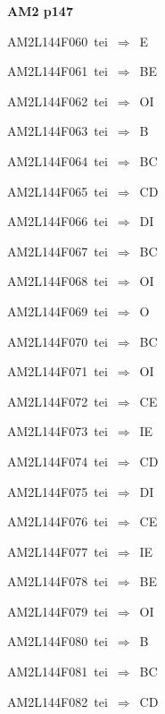 \par\vfill\eject
{\bf\hfill AM2 p147\hfill\hbox{}}\par\bigskip
{\sixrm AM2L144F060\ {\sixit tei}\ }$\Rightarrow$\ E\par\smallskip
{\sixrm AM2L144F061\ {\sixit tei}\ }$\Rightarrow$\ BE\par\smallskip
{\sixrm AM2L144F062\ {\sixit tei}\ }$\Rightarrow$\ OI\par\smallskip
{\sixrm AM2L144F063\ {\sixit tei}\ }$\Rightarrow$\ B\par\smallskip
{\sixrm AM2L144F064\ {\sixit tei}\ }$\Rightarrow$\ BC\par\smallskip
{\sixrm AM2L144F065\ {\sixit tei}\ }$\Rightarrow$\ CD\par\smallskip
{\sixrm AM2L144F066\ {\sixit tei}\ }$\Rightarrow$\ DI\par\smallskip
{\sixrm AM2L144F067\ {\sixit tei}\ }$\Rightarrow$\ BC\par\smallskip
{\sixrm AM2L144F068\ {\sixit tei}\ }$\Rightarrow$\ OI\par\smallskip
{\sixrm AM2L144F069\ {\sixit tei}\ }$\Rightarrow$\ O\par\smallskip
{\sixrm AM2L144F070\ {\sixit tei}\ }$\Rightarrow$\ BC\par\smallskip
{\sixrm AM2L144F071\ {\sixit tei}\ }$\Rightarrow$\ OI\par\smallskip
{\sixrm AM2L144F072\ {\sixit tei}\ }$\Rightarrow$\ CE\par\smallskip
{\sixrm AM2L144F073\ {\sixit tei}\ }$\Rightarrow$\ IE\par\smallskip
{\sixrm AM2L144F074\ {\sixit tei}\ }$\Rightarrow$\ CD\par\smallskip
{\sixrm AM2L144F075\ {\sixit tei}\ }$\Rightarrow$\ DI\par\smallskip
{\sixrm AM2L144F076\ {\sixit tei}\ }$\Rightarrow$\ CE\par\smallskip
{\sixrm AM2L144F077\ {\sixit tei}\ }$\Rightarrow$\ IE\par\smallskip
{\sixrm AM2L144F078\ {\sixit tei}\ }$\Rightarrow$\ BE\par\smallskip
{\sixrm AM2L144F079\ {\sixit tei}\ }$\Rightarrow$\ OI\par\smallskip
{\sixrm AM2L144F080\ {\sixit tei}\ }$\Rightarrow$\ B\par\smallskip
{\sixrm AM2L144F081\ {\sixit tei}\ }$\Rightarrow$\ BC\par\smallskip
{\sixrm AM2L144F082\ {\sixit tei}\ }$\Rightarrow$\ CD\par\smallskip
